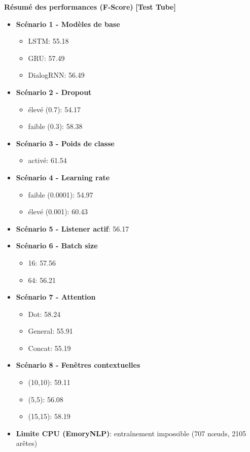 \documentclass[a4paper,11pt]{article}
\begin{document}
\textbf{Résumé des performances (F‐Score)} \textbf{[Test Tube]}
\begin{itemize}
  \item \textbf{Scénario 1 - Modèles de base}
    \begin{itemize}
      \item LSTM: 55.18  
      \item GRU: 57.49  
      \item DialogRNN: 56.49  
    \end{itemize}
  \item \textbf{Scénario 2 - Dropout}
    \begin{itemize}
      \item élevé (0.7): 54.17  
      \item faible (0.3): 58.38  
    \end{itemize}
  \item \textbf{Scénario 3 - Poids de classe}
    \begin{itemize}
      \item activé: 61.54  
    \end{itemize}
  \item \textbf{Scénario 4 - Learning rate}
    \begin{itemize}
      \item faible (0.0001): 54.97  
      \item élevé (0.001): 60.43  
    \end{itemize}
  \item \textbf{Scénario 5 - Listener actif}: 56.17  
  \item \textbf{Scénario 6 - Batch size}
    \begin{itemize}
      \item 16: 57.56  
      \item 64: 56.21  
    \end{itemize}
  \item \textbf{Scénario 7 - Attention}
    \begin{itemize}
      \item Dot: 58.24  
      \item General: 55.91  
      \item Concat: 55.19  
    \end{itemize}
  \item \textbf{Scénario 8 - Fenêtres contextuelles}
    \begin{itemize}
      \item (10,10): 59.11  
      \item (5,5): 56.08  
      \item (15,15): 58.19  
    \end{itemize}
  \item \textbf{Limite CPU (EmoryNLP)}: entraînement impossible (707 nœuds, 2105 arêtes)
\end{itemize}
\end{document}
